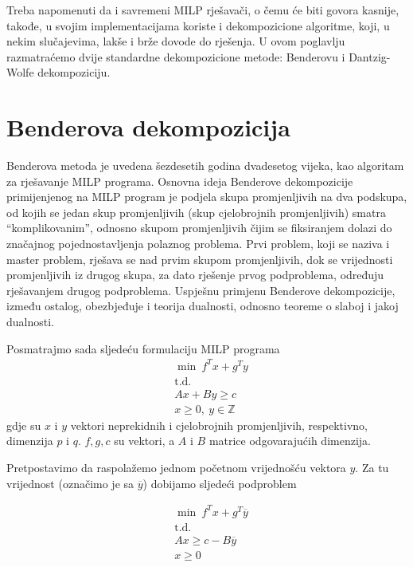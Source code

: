 \documentclass[a4paper, utf8, 11pt, colorlinks]{book}
\theoremstyle{definition}
\begin{document}
Treba napomenuti da i savremeni MILP rješavači, o čemu će biti govora kasnije, takođe, u svojim implementacijama koriste i dekompozicione algoritme, koji, u nekim slučajevima, lakše i brže dovode do rješenja. U ovom poglavlju razmatraćemo dvije standardne dekompozicione metode: Benderovu i Dantzig-Wolfe dekompoziciju.
 
 \section{Benderova dekompozicija}
 
 Benderova metoda je uvedena šezdesetih godina dvadesetog vijeka, kao algoritam za rješavanje MILP programa. 
 Osnovna ideja Benderove dekompozicije primijenjenog na MILP program je podjela skupa promjenljivih na dva podskupa, od kojih se jedan skup promjenljivih (skup cjelobrojnih promjenljivih) smatra ``komplikovanim'', odnosno skupom promjenljivih čijim se fiksiranjem dolazi do značajnog pojednostavljenja polaznog problema. Prvi problem, koji se naziva i master problem,  rješava se nad prvim skupom promjenljivih, dok se vrijednosti promjenljivih iz drugog skupa,  za dato rješenje prvog podproblema, određuju rješavanjem drugog podproblema. Uspješnu primjenu Benderove dekompozicije, između ostalog, obezbjeđuje i teorija dualnosti, odnosno teoreme o slaboj i jakoj dualnosti.
 

 Posmatrajmo sada sljedeću formulaciju MILP programa
\begin{equation}
 \begin{aligned}\label{bender1}
  &\min\  f^Tx+g^Ty\\
 & \mbox{t.d.}\\
  &Ax+By\geqslant c\\
 &x\geqslant 0,\ y \in \mathbb{Z}
 \end{aligned}
\end{equation}
 gdje su $x$ i $y$ vektori neprekidnih i cjelobrojnih promjenljivih, respektivno, dimenzija $p$ i $q$. $f,g,c$ su vektori, a $A$ i $B$ matrice odgovarajućih dimenzija. 
 
 Pretpostavimo da raspolažemo jednom početnom vrijednošću vektora $y$. Za tu vrijednost (označimo je sa $\overline{y}$) dobijamo sljedeći podproblem

\begin{equation}
	\begin{aligned}\label{bender2}
 			&\min\  f^Tx+g^T\overline{y}\\
 		& \mbox{t.d.}\\
 		& Ax\geqslant c-B\overline{y}\\
 		& x\geqslant 0
 \end{aligned}
\end{equation}
\end{document}
